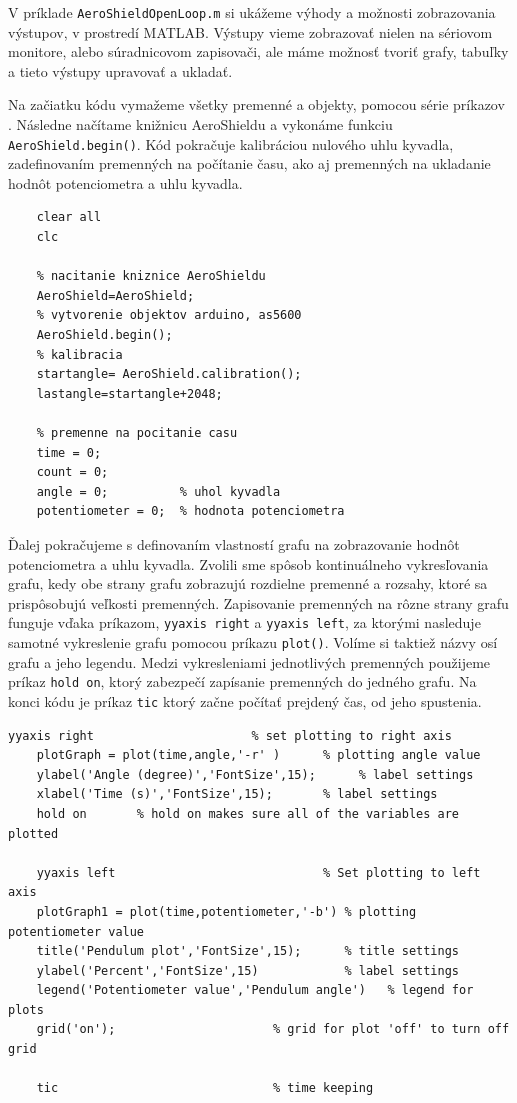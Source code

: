 V príklade \verb|AeroShieldOpenLoop.m| si ukážeme výhody a možnosti zobrazovania výstupov, v prostredí MATLAB. Výstupy vieme zobrazovať nielen na sériovom monitore, alebo súradnicovom zapisovači, ale máme možnosť tvoriť grafy, tabuľky a tieto výstupy upravovať a ukladať. 

Na začiatku kódu vymažeme všetky premenné a objekty, pomocou série príkazov . Následne načítame knižnicu AeroShieldu a vykonáme funkciu \verb|AeroShield.begin()|. Kód pokračuje kalibráciou nulového uhlu kyvadla, zadefinovaním premenných na počítanie času, ako aj premenných na ukladanie hodnôt potenciometra a uhlu kyvadla. 

\begin{lstlisting}[caption={AeroShield open loop inicializacia.},captionpos=b]
	% vymazanie premennych a objektov 
	clear all
	clc 
	
	% nacitanie kniznice AeroShieldu  
	AeroShield=AeroShield;
	% vytvorenie objektov arduino, as5600
	AeroShield.begin();
	% kalibracia
	startangle= AeroShield.calibration(); 
	lastangle=startangle+2048; 
	
	% premenne na pocitanie casu
	time = 0;
	count = 0;
	angle = 0;          % uhol kyvadla
	potentiometer = 0;  % hodnota potenciometra
\end{lstlisting}

Ďalej pokračujeme s definovaním vlastností grafu na zobrazovanie hodnôt potenciometra a uhlu kyvadla. Zvolili sme spôsob kontinuálneho vykresľovania grafu, kedy obe strany grafu zobrazujú rozdielne premenné a rozsahy, ktoré sa prispôsobujú veľkosti premenných. Zapisovanie premenných na rôzne strany grafu funguje vďaka príkazom, \verb|yyaxis right| a \verb|yyaxis left|, za ktorými nasleduje samotné vykreslenie grafu pomocou príkazu \verb|plot()|. Volíme si taktiež názvy osí grafu a jeho legendu. Medzi vykresleniami jednotlivých premenných použijeme príkaz \verb|hold on|, ktorý zabezpečí zapísanie premenných do jedného grafu. Na konci kódu je príkaz \verb|tic| ktorý začne počítať prejdený čas, od jeho spustenia. 

\begin{lstlisting}[caption={AeroShield open loop grafy.},captionpos=b]
	yyaxis right                      % set plotting to right axis 
	plotGraph = plot(time,angle,'-r' )      % plotting angle value
	ylabel('Angle (degree)','FontSize',15);      % label settings
	xlabel('Time (s)','FontSize',15);       % label settings
	hold on       % hold on makes sure all of the variables are plotted
	
	yyaxis left                             % Set plotting to left axis
	plotGraph1 = plot(time,potentiometer,'-b') % plotting potentiometer value
	title('Pendulum plot','FontSize',15);      % title settings   
	ylabel('Percent','FontSize',15)            % label settings
	legend('Potentiometer value','Pendulum angle')   % legend for plots
	grid('on');                      % grid for plot 'off' to turn off grid
	
	tic                              % time keeping
\end{lstlisting}


